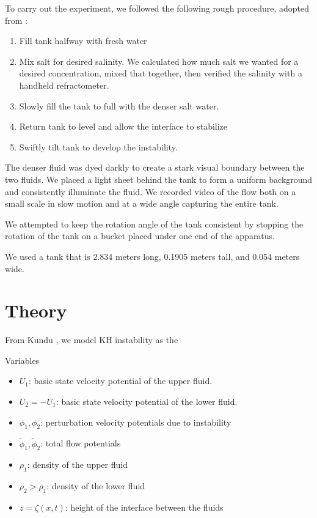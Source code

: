 \documentclass{article}
\begin{document}
To carry out the experiment, we followed the following rough procedure, adopted
from \cite{kh-instability-demo}:

\begin{enumerate}
    \item Fill tank halfway with fresh water
    \item Mix salt for desired salinity. We calculated how much salt we wanted
    for a desired concentration, mixed that together, then verified the salinity
    with a handheld refractometer.
    \item Slowly fill the tank to full with the denser salt water.
    \item Return tank to level and allow the interface to stabilize
    \item Swiftly tilt tank to develop the instability.
\end{enumerate}

The denser fluid was dyed darkly to create a stark visual boundary between the
two fluids. We placed a light sheet behind the tank to form a uniform background
and consistently illuminate the fluid. We recorded video of the flow both on a
small scale in slow motion and at a wide angle capturing the entire tank.

We attempted to keep the rotation angle of the tank consistent by stopping the
rotation of the tank on a bucket placed under one end of the apparatus.

We used a tank that is 2.834 meters long, 0.1905 meters tall, and 0.054 meters
wide.

\section{Theory}

From Kundu \cite{kundu}, we model KH instability as the %

Variables
\begin{itemize}
    \item \(U_1\): basic state velocity potential of the upper fluid.
    \item \(U_2 = -U_1\): basic state velocity potential of the lower fluid.
    \item \(\phi_1, \phi_2\): perturbation velocity potentials due to instability
    \item \(\tilde \phi_1, \tilde \phi_2\): total flow potentials
    \item \(\rho_1\): density of the upper fluid
    \item \(\rho_2 > \rho_1\): density of the lower fluid
    \item \(z = \zeta(x, t)\): height of the interface between the  fluids
\end{itemize}
\end{document}

